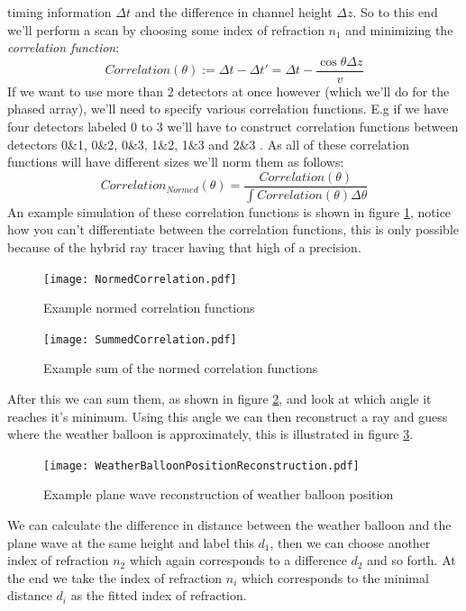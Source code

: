 timing information $\Delta t$ and the difference in channel height $\Delta z$.
So to this end we'll perform a scan by choosing some index of refraction $n_1$ and
minimizing the \textit{correlation function}:
\begin{equation}
	Correlation(\theta) := \Delta t - \Delta t' = \Delta t
	- \frac{\cos\theta \Delta z}{v}
  \label{eqn:PlaneWave}
\end{equation}
If we want to use more than 2 detectors at once however (which we'll do for the phased array), 
we'll need to specify various correlation functions.  E.g
if we have four detectors labeled 0 to 3 we'll have to construct correlation
functions between detectors 0\&1, 0\&2, 0\&3, 1\&2, 1\&3 and 2\&3 .  As all of
these correlation functions will have different sizes we'll norm them as
follows:
\begin{equation}
	Correlation_{Normed}(\theta) =
	\frac{Correlation(\theta)}{\int Correlation(\theta)\Delta
	\theta}
\end{equation}
An example simulation of these correlation functions is shown in figure \ref{fig:NormedCorrelation}, 
notice how you can't differentiate between the correlation functions, this is only possible
because of the hybrid ray tracer having that high of a precision.
\begin{figure}
	\centering
	\texttt{[image: NormedCorrelation.pdf]}
	\caption{Example normed correlation functions}
	\label{fig:NormedCorrelation}
\end{figure}
\begin{figure}
	\centering
	\texttt{[image: SummedCorrelation.pdf]}
	\caption{Example sum of the normed correlation functions}
	\label{fig:SummedCorrelation}
\end{figure}
After this we can sum them, as shown in figure \ref{fig:SummedCorrelation}, and look
at which angle it reaches it's minimum. Using this angle we can then reconstruct a ray and guess 
where the weather balloon is approximately, this is illustrated in figure 
\ref{fig:WeatherBalloonPositionReconstruction}. 
\begin{figure}
	\centering
	\texttt{[image: WeatherBalloonPositionReconstruction.pdf]}
	\caption{Example plane wave reconstruction of weather balloon position}
	\label{fig:WeatherBalloonPositionReconstruction}
\end{figure}
We can calculate the difference in distance between the weather balloon and the plane wave at the same height
and label this $d_1$, then we can choose another index of refraction $n_2$ which again corresponds to a difference
$d_2$ and so forth. At the end we take the index of refraction $n_i$ which corresponds to the minimal distance $d_i$
as the fitted index of refraction.

